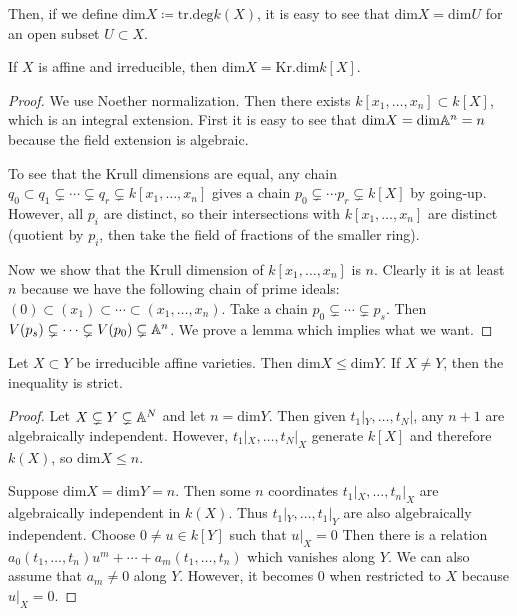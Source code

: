 \documentclass[twoside, 10pt]{article}
\begin{document}
    Then, if we define $\mathrm{dim} X \coloneqq \mathrm{tr.deg} k(X)$, it is
    easy to see that $\mathrm{dim} X = \mathrm{dim} U$ for an open subset $U
    \subset X$.

    \begin{thm} If $X$ is affine and irreducible, then $\mathrm{dim} X =
        \mathrm{Kr.dim} k[X]$.  \begin{proof} We use Noether normalization.
            Then there exists $k[x_1, \ldots, x_n] \subset k[X]$, which is an
            integral extension. First it is easy to see that $\mathrm{dim}X =
            \mathrm{dim}\mathbb{A}^n = n$ because the field extension is algebraic.

            To see that the Krull dimensions are equal, any chain $q_0 \subset
            q_1 \subsetneq \cdots \subsetneq q_r \subsetneq k[x_1, \ldots,
            x_n]$ gives a chain $p_0 \subsetneq \cdots p_r \subsetneq k[X]$ by
            going-up. However, all $p_i$ are distinct, so their intersections
            with $k[x_1, \ldots, x_n]$ are distinct (quotient by $p_i$, then
            take the field of fractions of the smaller ring).

            Now we show that the Krull dimension of $k[x_1, \ldots, x_n]$ is
            $n$. Clearly it is at least $n$  because we have the following
            chain of prime ideals: $(0) \subset (x_1) \subset \cdots \subset
            (x_1, \ldots, x_n)$. Take a chain $p_0 \subsetneq \cdots \subsetneq
        p_s$. Then $V(p_s) \subsetneq \cdots \subsetneq V(p_0) \subsetneq
    \mathbb{A}^n$. We prove a lemma which implies what we want.  \end{proof} \end{thm}

    \begin{lem} Let $X \subset Y$ be irreducible affine varieties. Then
        $\mathrm{dim} X \leq \mathrm{dim} Y$. If $X \neq Y$, then the
        inequality is strict.  \begin{proof} Let $X \subsetneq Y \subsetneq
            \mathbb{A}^N$ and let $n = \mathrm{dim}Y$.  Then given $t_1|_Y, \ldots,
            t_N|$, any $n+1$ are algebraically independent. However, $t_1|_X,
            \ldots, t_N|_X$ generate $k[X]$ and therefore $k(X)$, so
            $\mathrm{dim}X \leq n$. 
            
            Suppose $\mathrm{dim} X = \mathrm{dim} Y = n$. Then some $n$
            coordinates $t_1|_X, \ldots, t_n|_X$ are algebraically independent
            in $k(X)$. Thus $t_1|_Y, \ldots, t_1|_Y$ are also algebraically
            independent. Choose $0 \neq u \in k[Y]$ such that $u|_X = 0$ Then
            there is a relation $a_0(t_1, \ldots, t_n)u^m + \cdots + a_m(t_1,
            \ldots, t_n)$ which vanishes along $Y$. We can also assume that
            $a_m \neq 0$ along $Y$. However, it becomes $0$ when restricted to
        $X$ because $u|_X = 0$.  \end{proof} \end{lem}
\end{document}
